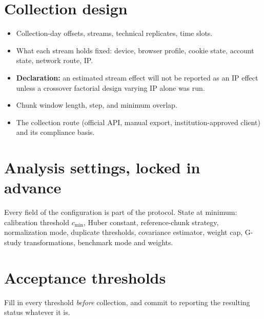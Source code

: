 \documentclass[12pt,a4paper,oneside]{article}
\begin{document}
\section{Collection design}

\begin{itemize}
\item Collection-day offsets, streams, technical replicates, time slots.
\item What each stream holds fixed: device, browser profile, cookie state,
account state, network route, IP.
\item \textbf{Declaration:} an estimated stream effect will not be reported as
an IP effect unless a crossover factorial design varying IP alone was run.
\item Chunk window length, step, and minimum overlap.
\item The collection route (official API, manual export, institution-approved
client) and its compliance basis.
\end{itemize}

\section{Analysis settings, locked in advance}

Every field of the configuration is part of the protocol. State at minimum:
calibration threshold $c_{\min}$, Huber constant, reference-chunk strategy,
normalization mode, duplicate thresholds, covariance estimator, weight cap,
G-study transformations, benchmark mode and weights.

\section{Acceptance thresholds}

Fill in every threshold \emph{before} collection, and commit to reporting the
resulting status whatever it is.
\end{document}

